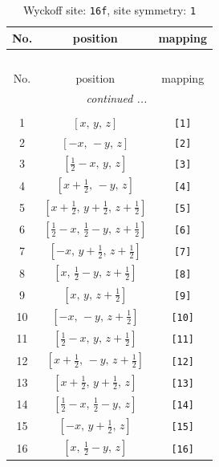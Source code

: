 \documentclass[fleqn,8pt]{jsarticle}
\begin{document}
\begin{longtable}{ccc}
\caption{Wyckoff site: {\tt 16f}, site symmetry: {\tt 1}}
 \\
 \hline \hline
No. & position & mapping \\ \hline \endfirsthead

\multicolumn{2}{l}{\tablename\ \thetable{}} \\
 \hline \hline
No. & position & mapping \\ \hline \endhead

 \hline \hline
\multicolumn{2}{r}{\footnotesize\it continued ...} \\ \endfoot

 \hline \hline
\multicolumn{2}{r}{} \\ \endlastfoot

1 & $\left[ x,\, y,\, z \right]$ & {\tt [1]} \\ \hline
2 & $\left[ - x,\, - y,\, z \right]$ & {\tt [2]} \\ \hline
3 & $\left[ \frac{1}{2} - x,\, y,\, z \right]$ & {\tt [3]} \\ \hline
4 & $\left[ x + \frac{1}{2},\, - y,\, z \right]$ & {\tt [4]} \\ \hline
5 & $\left[ x + \frac{1}{2},\, y + \frac{1}{2},\, z + \frac{1}{2} \right]$ & {\tt [5]} \\ \hline
6 & $\left[ \frac{1}{2} - x,\, \frac{1}{2} - y,\, z + \frac{1}{2} \right]$ & {\tt [6]} \\ \hline
7 & $\left[ - x,\, y + \frac{1}{2},\, z + \frac{1}{2} \right]$ & {\tt [7]} \\ \hline
8 & $\left[ x,\, \frac{1}{2} - y,\, z + \frac{1}{2} \right]$ & {\tt [8]} \\ \hline
9 & $\left[ x,\, y,\, z + \frac{1}{2} \right]$ & {\tt [9]} \\ \hline
10 & $\left[ - x,\, - y,\, z + \frac{1}{2} \right]$ & {\tt [10]} \\ \hline
11 & $\left[ \frac{1}{2} - x,\, y,\, z + \frac{1}{2} \right]$ & {\tt [11]} \\ \hline
12 & $\left[ x + \frac{1}{2},\, - y,\, z + \frac{1}{2} \right]$ & {\tt [12]} \\ \hline
13 & $\left[ x + \frac{1}{2},\, y + \frac{1}{2},\, z \right]$ & {\tt [13]} \\ \hline
14 & $\left[ \frac{1}{2} - x,\, \frac{1}{2} - y,\, z \right]$ & {\tt [14]} \\ \hline
15 & $\left[ - x,\, y + \frac{1}{2},\, z \right]$ & {\tt [15]} \\ \hline
16 & $\left[ x,\, \frac{1}{2} - y,\, z \right]$ & {\tt [16]} \\
\end{longtable}
\end{document}
